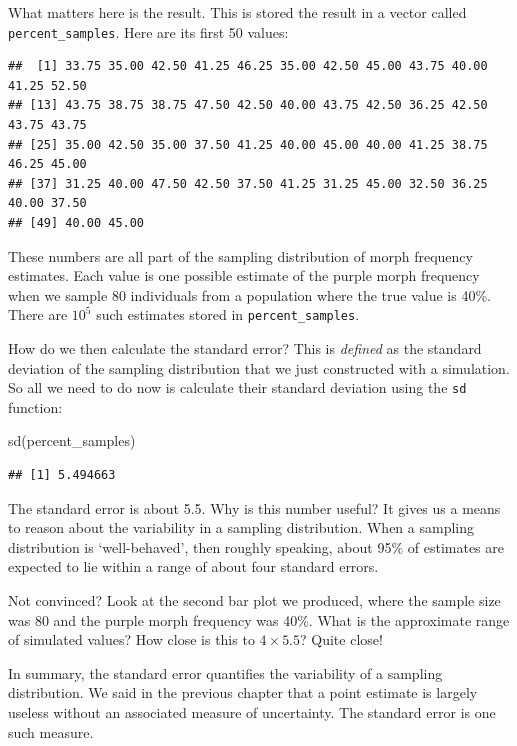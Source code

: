 \documentclass[
]{book}
\newenvironment{Shaded}{\begin{snugshade}}{\end{snugshade}}
\newcommand{\FunctionTok}[1]{\textcolor[rgb]{0.00,0.00,0.00}{#1}}
\newcommand{\NormalTok}[1]{#1}
\begin{document}
What matters here is the result. This is stored the result in a vector called \texttt{percent\_samples}. Here are its first 50 values:

\begin{verbatim}
##  [1] 33.75 35.00 42.50 41.25 46.25 35.00 42.50 45.00 43.75 40.00 41.25 52.50
## [13] 43.75 38.75 38.75 47.50 42.50 40.00 43.75 42.50 36.25 42.50 43.75 43.75
## [25] 35.00 42.50 35.00 37.50 41.25 40.00 45.00 40.00 41.25 38.75 46.25 45.00
## [37] 31.25 40.00 47.50 42.50 37.50 41.25 31.25 45.00 32.50 36.25 40.00 37.50
## [49] 40.00 45.00
\end{verbatim}

These numbers are all part of the sampling distribution of morph frequency estimates. Each value is one possible estimate of the purple morph frequency when we sample 80 individuals from a population where the true value is 40\%. There are \ensuremath{10^{5}} such estimates stored in \texttt{percent\_samples}.

How do we then calculate the standard error? This is \emph{defined} as the standard deviation of the sampling distribution that we just constructed with a simulation. So all we need to do now is calculate their standard deviation using the \texttt{sd} function:

\begin{Shaded}
\begin{Highlighting}[]
\FunctionTok{sd}\NormalTok{(percent\_samples)}
\end{Highlighting}
\end{Shaded}

\begin{verbatim}
## [1] 5.494663
\end{verbatim}

The standard error is about 5.5. Why is this number useful? It gives us a means to reason about the variability in a sampling distribution. When a sampling distribution is `well-behaved', then roughly speaking, about 95\% of estimates are expected to lie within a range of about four standard errors.

Not convinced? Look at the second bar plot we produced, where the sample size was 80 and the purple morph frequency was 40\%. What is the approximate range of simulated values? How close is this to \(4 \times 5.5\)? Quite close!

In summary, the standard error quantifies the variability of a sampling distribution. We said in the previous chapter that a point estimate is largely useless without an associated measure of uncertainty. The standard error is one such measure.
\end{document}
